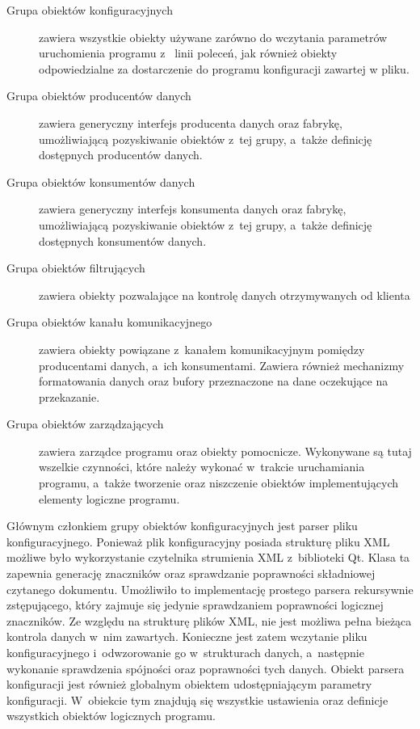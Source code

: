 \begin{description}
\item[Grupa obiektów konfiguracyjnych] zawiera wszystkie obiekty
  używane zarówno do wczytania parametrów uruchomienia programu z~
  linii poleceń, jak również obiekty odpowiedzialne za dostarczenie do
  programu konfiguracji zawartej w pliku.
\item[Grupa obiektów producentów danych] \raggedright{zawiera generyczny interfejs
  producenta danych oraz fabrykę, umożliwiającą pozyskiwanie obiektów
  z~tej grupy, a~także definicję dostępnych producentów danych.}
\item[Grupa obiektów konsumentów danych] zawiera generyczny interfejs
  konsumenta danych oraz fabrykę, umożliwiającą pozyskiwanie obiektów
  z~tej grupy, a~także definicję dostępnych konsumentów danych.
\item[Grupa obiektów filtrujących] zawiera obiekty pozwalające na
  kontrolę danych otrzymywanych od klienta
\item[Grupa obiektów kanału komunikacyjnego] zawiera obiekty powiązane
  z~kanałem komunikacyjnym pomiędzy producentami danych, a~ich
  konsumentami. Zawiera również mechanizmy formatowania danych oraz
  bufory przeznaczone na dane oczekujące na przekazanie.
\item[Grupa obiektów zarządzających] zawiera zarządce programu oraz
  obiekty pomocnicze. Wykonywane są tutaj wszelkie czynności, które
  należy wykonać w~trakcie uruchamiania programu, a~także tworzenie
  oraz niszczenie obiektów implementujących elementy logiczne
  programu.
\end{description}

Głównym członkiem grupy obiektów konfiguracyjnych jest parser pliku
konfiguracyjnego. Ponieważ plik konfiguracyjny posiada strukturę pliku
XML możliwe było wykorzystanie czytelnika strumienia XML z~biblioteki
Qt. Klasa ta zapewnia generację znaczników oraz sprawdzanie
poprawności składniowej czytanego dokumentu. Umożliwiło to
implementację prostego parsera rekursywnie zstępującego, który zajmuje
się jedynie sprawdzaniem poprawności logicznej znaczników. Ze względu
na strukturę plików XML, nie jest możliwa pełna bieżąca kontrola
danych w~nim zawartych. Konieczne jest zatem wczytanie pliku
konfiguracyjnego i~odwzorowanie go w~strukturach danych, a~następnie
wykonanie sprawdzenia spójności oraz poprawności tych danych. Obiekt
parsera konfiguracji jest również globalnym obiektem udostępniającym
parametry konfiguracji. W~obiekcie tym znajdują się wszystkie
ustawienia oraz definicje wszystkich obiektów logicznych programu.

